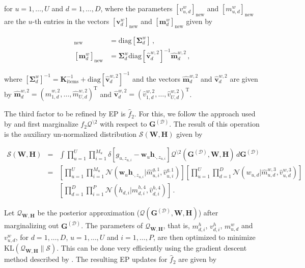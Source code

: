 \documentclass{article}
\begin{document}
for $u = 1,\ldots,U$ and $d = 1,\ldots,D$,
where the parameters $[v_{u,d}^{w}]_\text{new}$ and $[ m_{u,d}^{w}]_\text{new}$ are the $u$-th entries in the vectors
$[\mathbf{v}_{d}^{w}]_\text{new}$ and $[\mathbf{m}_{d}^{w}]_\text{new}$ given by

\begin{align}
[\mathbf{v}_{d}^{w}]_\text{new} & = \text{diag}\left[ \bm \Sigma_d^w \right]\,,\label{eq:Sigmaw} \\
[\mathbf{m}_{d}^{w}]_\text{new} & = \bm \Sigma_d^w \text{diag}[\hat{\mathbf{v}}_d^{w,2}]^{-1} \hat{\mathbf{m}}_d^{w,2}\label{eq:Sigma2w}\,,
\end{align}

where $[ \bm \Sigma_d^w]^{-1} = \mathbf{K}^{-1}_\text{items} + \text{diag}[\hat{\mathbf{v}}_d^{w,2}]^{-1}$ and
the vectors $\hat{\mathbf{m}}_d^{w,2}$ and $\hat{\mathbf{v}}_d^{w,2}$ are given by
$\hat{\mathbf{m}}_d^{w,2}=(\hat{m}_{1,d}^{w,2},\ldots,\hat{m}_{U,d}^{w,2})^\text{T}$ and
$\hat{\mathbf{v}}_d^{w,2}=(\hat{v}_{1,d}^{w,2},\ldots,\hat{v}_{U,d}^{w,2})^\text{T}$.

The third factor to be refined by EP is $\hat{f}_2$. For this, we follow the approach used by \cite{stern2009}
and first marginalize $f_2\mathcal{Q}^{\setminus 2}$ with respect to $\mathbf{G}^{(\mathcal{D})}$.
The result of this operation is the auxiliary un-normalized distribution $\mathcal{S}(\mathbf{W},\mathbf{H})$ given by

\begin{eqnarray}
\mathcal{S}(\mathbf{W},\mathbf{H}) & = & \int 
\prod_{u=1}^{U} \prod_{i=1}^{M_u}\delta[g_{u,z_{u,i}}-\mathbf{w}_u\mathbf{h}_{\cdot,z_{u,i}}]
\mathcal{Q}^{\setminus 2 }(\mathbf{G}^{(\mathcal{D})},\mathbf{W},\mathbf{H})\,d\mathbf{G}^{(\mathcal{D})}\nonumber\\
& = & \left[\prod_{u=1}^{U}
\prod_{i=1}^{M_u}\mathcal{N}(\mathbf{w}_u\mathbf{h}_{\cdot,z_{u,i}}|\hat{m}^{g,1}_{u,i},\hat{v}^{g,1}_{u,i})\right]
\left[ \prod_{u=1}^U\prod_{d=1}^D \mathcal{N}(w_{u,d}|\hat{m}^{w,3}_{u,d},\hat{v}^{w,3}_{u,d}) \right]\nonumber \\
& & \left[ \prod_{d=1}^D\prod_{i=1}^P \mathcal{N}(h_{d,i}|\hat{m}^{h,4}_{d,i},\hat{v}^{h,4}_{d,i}) \right]\,.
\end{eqnarray}

Let $\mathcal{Q}_{\mathbf{W},\mathbf{H}}$ be the posterior approximation ($\mathcal{Q}(\mathbf{G}^{(\mathcal{D})},\mathbf{W},\mathbf{H})$) after marginalizing out $\mathbf{G}^{(\mathcal{D})}$.
The parameters of $\mathcal{Q}_{\mathbf{W},\mathbf{H}}$, that is, $m_{d,i}^{h}$,
$v_{d,i}^{h}$, $m_{u,d}^{w}$ and $v_{u,d}^{w}$, for $d = 1,\ldots,D$, $u=1,\ldots,U$ and $i = 1,\ldots,P$,
are then optimized to minimize $\text{KL}(\mathcal{Q}_{\mathbf{W},\mathbf{H}}\|\mathcal{S})$.
This can be done very efficiently using the gradient descent method described by \cite{raiko2007}. The resulting EP updates for $\hat{f}_2$ are
given by
\end{document}
